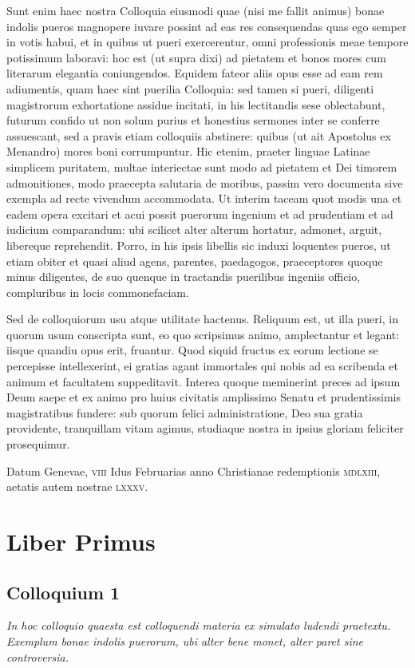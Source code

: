 \documentclass{article}
\begin{document}
Sunt enim haec nostra Colloquia eiusmodi quae (nisi me fallit animus) bonae indolis pueros magnopere iuvare possint ad eas res consequendas quas ego semper in votis habui, et in quibus ut pueri exercerentur, omni professionis meae tempore potissimum laboravi: hoc est (ut supra dixi) ad pietatem et bonos mores cum literarum elegantia coniungendos. Equidem fateor aliis opus esse ad eam rem adiumentis, quam haec sint puerilia Colloquia: sed tamen si pueri, diligenti magistrorum exhortatione assidue incitati, in his lectitandis sese oblectabunt, futurum confido ut non solum purius et honestius sermones inter se conferre assuescant, sed a pravis etiam colloquiis abstinere: quibus (ut ait Apostolus ex Menandro) mores boni corrumpuntur. Hic etenim, praeter linguae Latinae simplicem puritatem, multae interiectae sunt modo ad pietatem et Dei timorem admonitiones, modo praecepta salutaria de moribus, passim vero documenta sive exempla ad recte vivendum accommodata. Ut interim taceam quot modis una et eadem opera excitari et acui possit puerorum ingenium et ad prudentiam et ad iudicium comparandum: ubi scilicet alter alterum hortatur, admonet, arguit, libereque reprehendit. Porro, in his ipsis libellis sic induxi loquentes pueros, ut etiam obiter et quasi aliud agens, parentes, paedagogos, praeceptores quoque minus diligentes, de suo quenque in tractandis puerilibus ingeniis officio, compluribus in locis commonefaciam.

Sed de colloquiorum usu atque utilitate hactenus. Reliquum est, ut illa pueri, in quorum usum conscripta sunt, eo quo scripsimus animo, amplectantur et legant: iisque quandiu opus erit, fruantur. Quod siquid fructus ex eorum lectione se percepisse intellexerint, ei gratias agant immortales qui nobis ad ea scribenda et animum et facultatem suppeditavit. Interea quoque meminerint preces ad ipsum Deum saepe et ex animo pro huius civitatis amplissimo Senatu et prudentissimis magistratibus fundere: sub quorum felici administratione, Deo sua gratia providente, tranquillam vitam agimus, studiaque nostra in ipsius gloriam feliciter prosequimur. 


Datum Genevae, \textsc{viii} Idus Februarias anno Christianae redemptionis \textsc{mdlxiii}, aetatis autem nostrae \textsc{lxxxv}.

\setlength{\parindent}{0em}
\section{Liber Primus}
\subsection{Colloquium 1}
\emph{In hoc colloquio quaesta est colloquendi materia ex simulato ludendi praetextu. Exemplum bonae indolis puerorum, ubi alter bene monet, alter paret sine controversia.}
\end{document}
